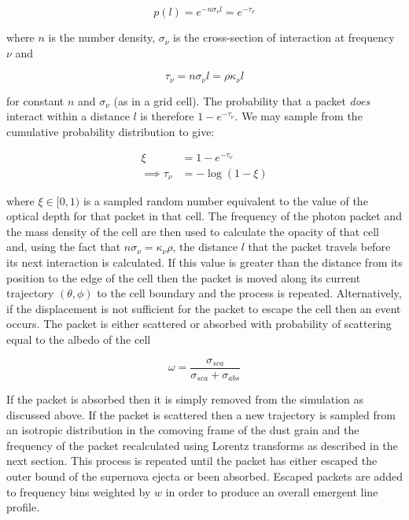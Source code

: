 \begin{equation}
p(l)=e ^{-n \sigma_{\nu} l}=e ^{-\tau_{\nu}} 
\end{equation}

\noindent where $n$ is the number density, $\sigma_{\nu}$ is the cross-section of interaction at frequency $\nu$ and 

\begin{equation}
 \tau_{\nu} = n\sigma_{\nu} l = \rho \kappa_{\nu}  l
 \end{equation}
 
 \noindent for constant $n$ and $\sigma_{\nu}$ (as in a grid cell).  The probability that a packet \textit{does} interact within a distance $l$ is therefore $1-e^{-\tau_{\nu}}$.  We may sample from the cumulative probability distribution to give: 

\begin{align}
\xi &= 1 - e^{-\tau_{\nu}}  \\
\implies  \tau_{\nu}&=-\log (1-\xi) 
\end{align}

\noindent where $\xi \in [0,1)$ is a sampled random number equivalent to the value of the optical depth for that packet in that cell.  The frequency of the photon packet and the mass density of the cell are then used to calculate the opacity of that cell and, using the fact that $n\sigma_{\nu}=\kappa_{\nu}\rho$, the distance $l$ that the packet travels before its next interaction is calculated.  If this value is greater than the distance from its position to the edge of the cell then the packet is moved along its current trajectory $(\theta,\phi)$ to the cell boundary and the process is repeated.  Alternatively, if the displacement is not sufficient for the packet to escape the cell then an event occurs.  The packet is either scattered or absorbed with probability of scattering equal to the albedo of the cell

\begin{equation}
	\omega=\frac{\sigma_{sca}}{\sigma_{sca}+\sigma_{abs}}
\end{equation}

If the packet is absorbed then it is simply removed from the simulation as discussed above.  If the packet is scattered then a new trajectory is sampled from an isotropic distribution in the comoving frame of the dust grain and the frequency of the packet recalculated using Lorentz transforms as described in the next section.  This process is repeated until the packet has either escaped the outer bound of the supernova ejecta or been absorbed.  Escaped packets are added to frequency bins weighted by $w$ in order to produce an overall emergent line profile.


